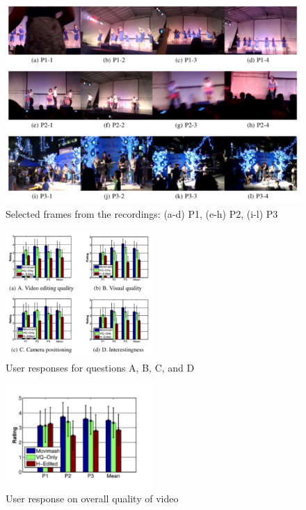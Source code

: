 \documentclass{new}
\begin{document}
\begin{figure}[h]
    \centering
    \includegraphics[width=01\textwidth]{img6.png}
    \caption{Selected frames from the recordings: (a-d) P1, (e-h) P2, (i-l) P3}
    \label{fig:mesh6}
\end{figure}
\begin{figure}[h]
    \centering
    \includegraphics[width=0.5\textwidth]{img7.png}
    \caption{User responses for questions A, B, C, and D}
    \label{fig:mesh7}
\end{figure}


\begin{figure}[h]
    \centering
    \includegraphics[width=0.5\textwidth]{img8.png}
    \caption{User response on overall quality of video}
    \label{fig:mesh8}
\end{figure}
\end{document}
